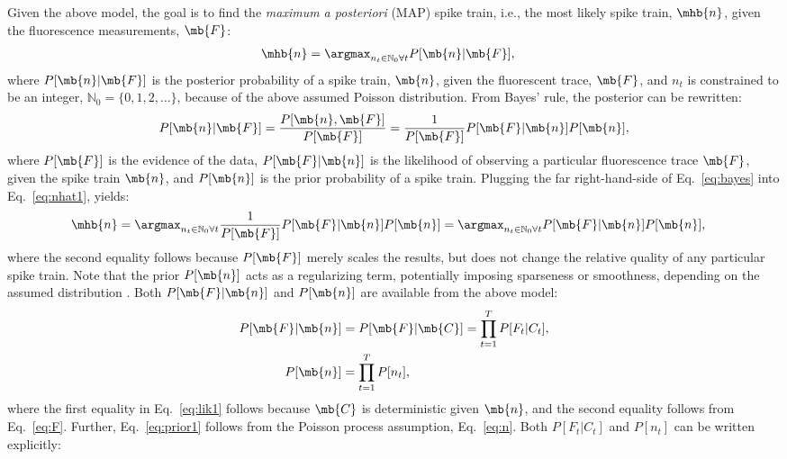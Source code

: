 Given the above model, the goal is to find the \emph{maximum a posteriori} (MAP) spike train, i.e.,  the most likely spike train, $\mhb{n}$,  given the fluorescence measurements, $\mb{F}$:
\begin{align} \label{eq:nhat1} 
\mhb{n} &=  \anx P[\mb{n} | \mb{F}], 
\end{align}
\noindent where $P[\mb{n} | \mb{F}]$ is the posterior probability of a spike train, $\mb{n}$, given the fluorescent trace, $\mb{F}$, and $n_t$ is constrained to be an integer, $\mathbb{N}_0=\{0,1,2,\ldots\}$, because of the above assumed Poisson distribution.  From Bayes' rule, the posterior can be rewritten:
\begin{align} \label{eq:bayes}
P[\mb{n} | \mb{F}] = \frac{P[\mb{n}, \mb{F}]}{P[\mb{F}]} = \frac{1}{P[\mb{F}]} P[\mb{F} | \mb{n}] P[\mb{n}],
\end{align}
\noindent where $P[\mb{F}]$ is the evidence of the data, $P[\mb{F} | \mb{n}]$ is the likelihood of observing a particular fluorescence trace $\mb{F}$, given the spike train $\mb{n}$, and $P[\mb{n}]$ is the prior probability of a spike train.  Plugging the far right-hand-side of Eq.~\eqref{eq:bayes} into Eq.~\eqref{eq:nhat1}, yields:
\begin{align} \label{eq:nhat2} 
\mhb{n} &=  \anx \frac{1}{P[\mb{F}]} P[\mb{F} | \mb{n}] P[\mb{n}] =  \anx  P[\mb{F} | \mb{n}] P[\mb{n}],
\end{align}
\noindent where the second equality follows because $P[\mb{F}]$ merely scales the results, but does not change the relative quality of any particular spike train.  Note that the prior $P[\mb{n}]$ acts as a regularizing term, potentially imposing sparseness or smoothness, depending on the assumed distribution \cite{WuGallant06,Seeger08}. Both $P[\mb{F} | \mb{n}]$ and $P[\mb{n}]$ are available from the above model:
\begin{subequations} \label{eq:post1}
\begin{align}
P[\mb{F} | \mb{n}]&= P[\mb{F} | \mb{C}] 	= \prod_{t=1}^T P[F_t | C_t], \label{eq:lik1} \\ 
P[\mb{n}] 		&= \prod_{t=1}^T P[n_t], \label{eq:prior1}
\end{align}
\end{subequations}
\noindent where the first equality in Eq.~\eqref{eq:lik1} follows because $\mb{C}$ is deterministic given $\mb{n}$, and the second equality follows from Eq.~\eqref{eq:F}. Further, Eq.~\eqref{eq:prior1} follows from the Poisson process assumption, Eq.~\eqref{eq:n}.  Both $P[F_t | C_t]$ and $P[n_t]$ can be written explicitly:

